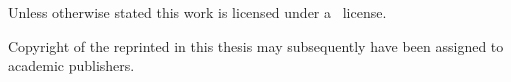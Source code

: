 
\begin{center}
    \begin{minipage}[c][\textheight-3em][b]{\textwidth-10em-2em}
        Unless otherwise stated this work is licensed under a \doclicenseLongNameRef~license.
    \end{minipage}
    \hfill
    \begin{minipage}[c][\textheight-3em][b]{10em}
        \doclicenseImage
    \end{minipage}
    
    \begin{minipage}[c][3em][b]{\textwidth}
        Copyright of the  reprinted in 
        this thesis may subsequently have been assigned to academic publishers.
    \end{minipage}
\end{center}
